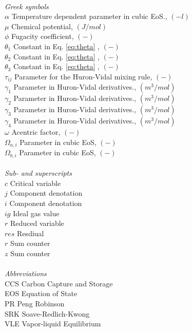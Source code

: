 \begin{tabbing}
\\ \textit{Greek symbols}\\
$\alpha$ \> Temperature dependent parameter in cubic EoS., $(-l)$\\
$\mu$ \> Chemical potential, $(J/mol)$\\
$\phi$ \> Fugacity coefficient, $(-)$\\
$\theta_1$ \> Constant in Eq. \ref{eq:theta} , $(-)$\\
$\theta_2$ \> Constant in Eq. \ref{eq:theta} , $(-)$\\
$\theta_3$ \> Constant in Eq. \ref{eq:theta} , $(-)$\\
$\tau_{ij}$ \> Parameter for the Huron-Vidal mixing rule, $(-)$\\
$\gamma_1$ \> Parameter in Huron-Vidal derivatives., $(m^3/mol)$\\
$\gamma_2$ \> Parameter in Huron-Vidal derivatives., $(m^3/mol)$\\
$\gamma_3$ \> Parameter in Huron-Vidal derivatives., $(m^3/mol)$\\
$\gamma_4$ \> Parameter in Huron-Vidal derivatives., $(m^3/mol)$\\
$\omega$ \> Acentric factor, $(-)$\\
$\Omega_{a,i}$ \> Parameter in cubic EoS, $(-)$\\
$\Omega_{b,i}$ \> Parameter in cubic EoS, $(-)$\\
\\

\textit{Sub- and superscripts}\\
$c$ \> Critical variable \\
$j$ \> Component denotation \\
$i$ \> Component denotation \\
$ig$ \> Ideal gas value \\
$r$ \> Reduced variable \\
$res$ \> Resdiual \\
$r$ \> Sum counter \\
$z$ \> Sum counter \\


\\
\textit{Abbreviations}\\
CCS \> Carbon Capture and Storage	\\
EOS \> Equation of State	\\
PR \> Peng Robinson	\\
SRK \> Soave-Redlich-Kwong	\\
VLE \> Vapor-liquid Equilibrium	\\
 \end{tabbing}

